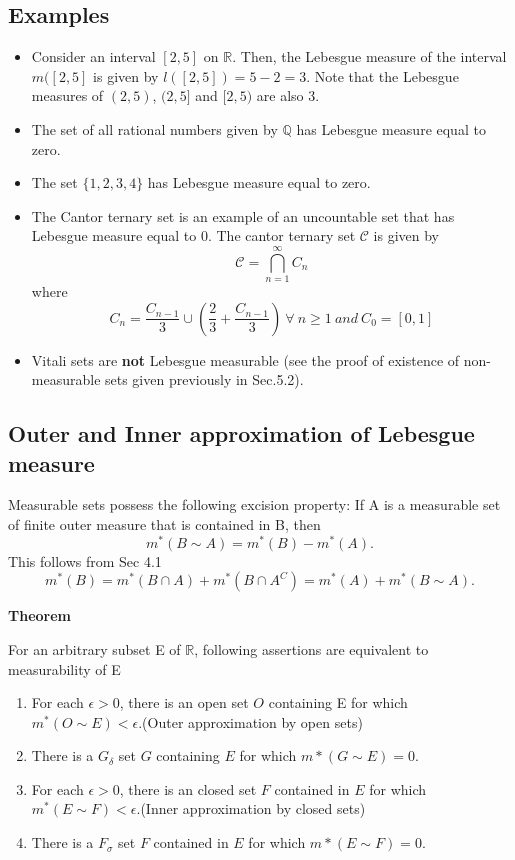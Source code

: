 \documentclass{article}
\begin{document}
\subsection{Examples}
\begin{itemize}
	\item Consider an interval $[2, 5]$ on $\mathbb{R}$. Then, the Lebesgue measure of the interval $m([2, 5]$ is given by $l([2, 5]) = 5 - 2 = 3$. Note that the Lebesgue measures of $(2, 5)$, $(2, 5]$ and $[2, 5)$ are also 3.
	\item The set of all rational numbers given by $\mathbb{Q}$ has Lebesgue measure equal to zero.
	\item The set $\{1, 2, 3, 4\}$ has Lebesgue measure equal to zero.
	\item The Cantor ternary set is an example of an uncountable set that has Lebesgue measure equal to 0. The cantor ternary set $\mathcal{C}$ is given by
	$$\mathcal{C} = \bigcap\limits_{n=1}^\infty C_n$$
	where
	$$C_n = \frac{C_{n-1}}{3} \cup ( \frac{2}{3} + \frac{C_{n-1}}{3} ) \  \forall\ n \geq 1 \ and\ C_0 =  [0, 1]$$
	\item Vitali sets are \textbf{not} Lebesgue measurable (see the proof of existence of non-measurable sets given previously in Sec.5.2).
\end{itemize}

\subsection{Outer and Inner approximation of Lebesgue measure}

Measurable sets possess the following excision property: If A is a measurable set of finite outer measure that is contained in B, then
$$ m^*(B \sim A)= m^*(B)-m^*(A).$$
This follows from Sec 4.1
$$m^*(B)=m^*(B \cap A) + m^*(B \cap A^C)= m^*(A)+  m^*(B \sim A).$$

{\large \textbf{Theorem}}

For an arbitrary subset E of $\mathbb{R}$, following assertions are equivalent to measurability of E

\begin{enumerate}

    \item For each $\epsilon >0$, there is an open set $O$ containing E for which $m^{*}(O \sim E)<\epsilon$.(Outer approximation by open sets)
    \item There is a $G_{\delta}$ set $G$ containing $E$ for which $m*(G \sim E) =0$. 
    
    \item For each $\epsilon >0$, there is an closed set $F$ contained in $E$ for which $m^{*}(E \sim F)<\epsilon$.(Inner approximation by closed sets)
    \item There is a $F_{\sigma}$ set $F$ contained in $E$ for which $m*(E \sim F) =0$. 
\end{enumerate}
\end{document}
